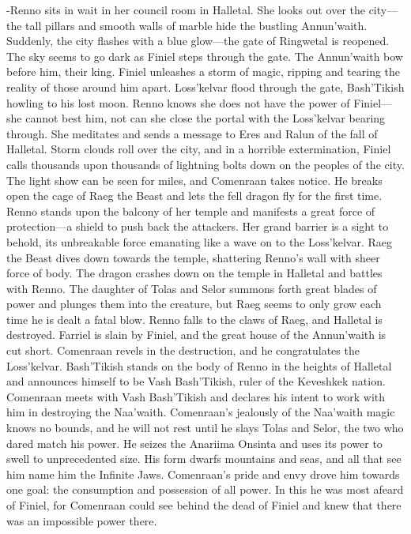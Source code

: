 \documentclass[smalldemyvopaper,11pt,twoside,onecolumn,openright,extrafontsizes]{memoir}
\begin{document}
-Renno sits in wait in her council room in Halletal. She looks out over the city—the tall pillars and smooth walls of marble hide the bustling Annun’waith. Suddenly, the city flashes with a blue glow—the gate of Ringwetal is reopened. The sky seems to go dark as Finiel steps through the gate. The Annun’waith bow before him, their king. Finiel unleashes a storm of magic, ripping and tearing the reality of those around him apart. Loss’kelvar flood through the gate, Bash’Tikish howling to his lost moon. Renno knows she does not have the power of Finiel—she cannot best him, not can she close the portal with the Loss’kelvar bearing through. She meditates and sends a message to Eres and Ralun of the fall of Halletal. Storm clouds roll over the city, and in a horrible extermination, Finiel calls thousands upon thousands of lightning bolts down on the peoples of the city. The light show can be seen for miles, and Comenraan takes notice. He breaks open the cage of Raeg the Beast and lets the fell dragon fly for the first time. Renno stands upon the balcony of her temple and manifests a great force of protection—a shield to push back the attackers. Her grand barrier is a sight to behold, its unbreakable force emanating like a wave on to the Loss’kelvar. Raeg the Beast dives down towards the temple, shattering Renno’s wall with sheer force of body. The dragon crashes down on the temple in Halletal and battles with Renno. The daughter of Tolas and Selor summons forth great blades of power and plunges them into the creature, but Raeg seems to only grow each time he is dealt a fatal blow. Renno falls to the claws of Raeg, and Halletal is destroyed. Farriel is slain by Finiel, and the great house of the Annun’waith is cut short. Comenraan revels in the destruction, and he congratulates the Loss’kelvar. Bash’Tikish stands on the body of Renno in the heights of Halletal and announces himself to be Vash Bash’Tikish, ruler of the Keveshkek nation. Comenraan meets with Vash Bash’Tikish and declares his intent to work with him in destroying the Naa’waith. Comenraan’s jealously of the Naa’waith magic knows no bounds, and he will not rest until he slays Tolas and Selor, the two who dared match his power. He seizes the Anariima Onsinta and uses its power to swell to unprecedented size. His form dwarfs mountains and seas, and all that see him name him the Infinite Jaws. Comenraan’s pride and envy drove him towards one goal: the consumption and possession of all power. In this he was most afeard of Finiel, for Comenraan could see behind the dead of Finiel and knew that there was an impossible power there.
\end{document}
